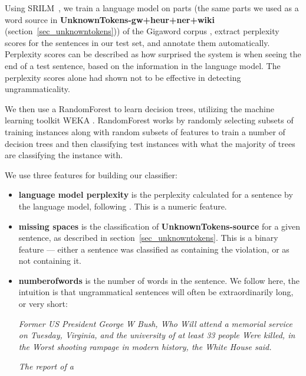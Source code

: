 \documentclass[a4paper,10pt]{scrartcl}
\theoremstyle{style}
\begin{document}
Using SRILM~\citep{stolcke2002srilm}, we train a language model on parts (the same parts we used as a word source in \textbf{UnknownTokens-gw+heur+ner+wiki} (section~\ref{sec_unknowntokens})) of the Gigaword corpus \citep{gigaword}, extract perplexity scores for the sentences in our test set, and annotate them automatically. Perplexity scores can be described as how surprised the system is when seeing the end of a test sentence, based on the information in the language model.
The perplexity scores alone had shown not to be effective in detecting ungrammaticality.

We then use a RandomForest \citep{breiman2001random} to learn decision trees, utilizing the machine learning toolkit WEKA \citep{hall2009weka}.
RandomForest works by randomly selecting subsets of training instances along with random subsets of features to train a number of decision trees and then classifying test instances with what the majority of trees are classifying the instance with.

We use three features for building our classifier:

\begin{itemize}
	\item \textbf{language model perplexity} is the perplexity calculated for a sentence by the language model, following \cite{sun2007detecting}. 
	This is a numeric feature.
	\item \textbf{missing spaces} is the classification of \textbf{UnknownTokens-source} for a given sentence, as described in section~\ref{sec_unknowntokens}. This is a binary feature --- either a sentence was classified as containing the violation, or as not containing it.
	\item \textbf{numberofwords} is the number of words in the sentence. We follow \cite{wagner2007comparative} here, the intuition is that ungrammatical sentences will often be extraordinarily long, or very short:
		\begin{framed}
		\textit{Former US President George W Bush, Who Will attend a memorial service on Tuesday, Virginia, and the university of at least 33 people Were killed, in the Worst shooting rampage in modern history, the White House said.}

		\textit{The report of a}
		\end{framed}
\end{itemize}
\end{document}
